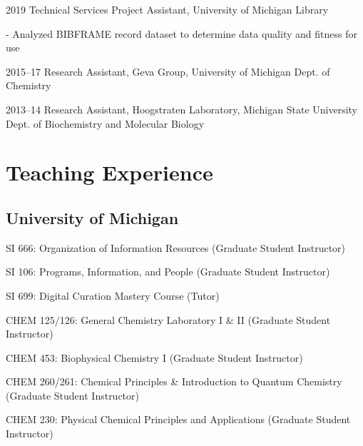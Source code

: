 \documentclass[12pt,letterpaper]{report}
\newcommand{\listitemspace}{0.25em}
\renewenvironment{itemize}
{\begin{list}{}{\setlength{\leftmargin}{0em}
            \setlength{\parskip}{0em}
            \setlength{\itemsep}{\listitemspace}
            \setlength{\parsep}{\listitemspace}}}
{\end{list}}
\begin{document}
\begin{tablist}
\begin{itemize}
\begin{footnotesize}
	\end{footnotesize} \end{itemize}
    
	\item[2019] \tab Technical Services Project Assistant, University of Michigan Library

	\begin{itemize} \begin{footnotesize}

		\item - Analyzed BIBFRAME record dataset to determine data quality and fitness for use

	\end{footnotesize} \end{itemize}

	\item[2015--17] \tab Research Assistant, Geva Group, University of Michigan Dept. of Chemistry
	
	\item[2013--14] \tab Research Assistant, Hoogstraten Laboratory, Michigan State University Dept. of Biochemistry and Molecular Biology

\end{tablist}



\section*{Teaching Experience}

\subsection*{University of Michigan}
    
\begin{itemize}
    	
    	\item SI 666: Organization of Information Resources (Graduate Student Instructor)
        
	\item SI 106: Programs, Information, and People (Graduate Student Instructor)
        
	\item SI 699: Digital Curation Mastery Course (Tutor)
        
	\item CHEM 125/126: General Chemistry Laboratory I \& II (Graduate Student Instructor)
        
	\item CHEM 453: Biophysical Chemistry I (Graduate Student Instructor)
        
	\item CHEM 260/261: Chemical Principles \& Introduction to Quantum Chemistry (Graduate Student Instructor)
        
	\item CHEM 230: Physical Chemical Principles and Applications (Graduate Student Instructor)
    
\end{itemize}
    	
\end{document}
